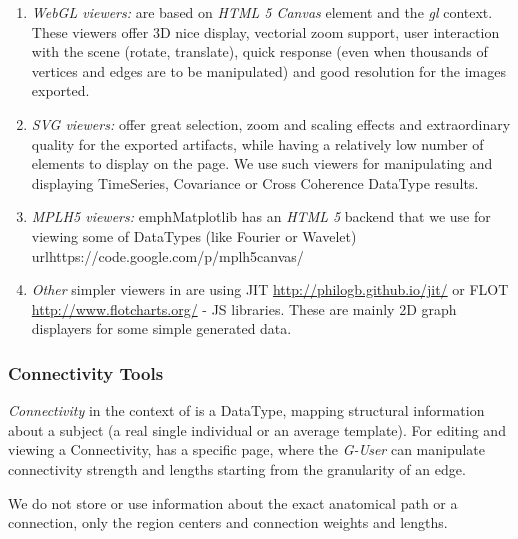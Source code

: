 	\begin{enumerate}
		\item \emph{WebGL viewers:} are based on \emph{HTML 5 Canvas} element
		and the \emph{gl} context. These viewers offer 3D nice display,
		vectorial zoom support, user interaction with the scene (rotate,
		translate), quick response (even when thousands of vertices and edges
		are to be manipulated) and good resolution for the images exported.
		
		\item \emph{SVG viewers:} offer great selection, zoom and scaling
		effects and extraordinary quality for the exported artifacts, while
		having a relatively low number of elements to display on the page. We
		use such viewers for manipulating and displaying TimeSeries,
		Covariance or Cross Coherence DataType results.

		\item \emph{MPLH5 viewers:}  emph{Matplotlib} has an \emph{HTML 5}
		backend that we use for viewing some of \TVB DataTypes (like
		Fourier or Wavelet) url{https://code.google.com/p/mplh5canvas/}

		\item \emph{Other} simpler viewers in \TVB are using JIT
		\url{http://philogb.github.io/jit/} or FLOT
		\url{http://www.flotcharts.org/} - JS libraries. These are mainly
		2D graph displayers for some simple \TVB generated data.
	\end{enumerate}


\subsubsection{Connectivity Tools}

		\emph{Connectivity} in the context of \TVB is a DataType, mapping structural
		information about a subject (a real single individual or an average template). For
		editing and viewing a Connectivity, \TVB has a specific page, where
		the \emph{G-User} can manipulate connectivity strength and lengths
		starting from the granularity of an edge.

		We do not store or use information about the exact anatomical path or
		a connection, only the region centers and connection weights and
		lengths.

